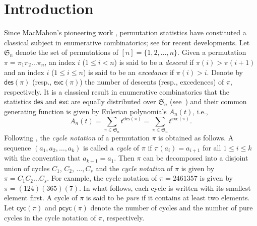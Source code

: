 \documentclass[12pt]{article}
\numberwithin{equation}{section}
\theoremstyle{plain}
\def\des{\mathsf{des}}
\def\cyc{\mathsf{cyc}}
\def\pcyc{\mathsf{pcyc}}
\def\exc{\mathsf{exc}}
\begin{document}
	\section{Introduction}
	Since MacMahon's pioneering work \cite{Mac}, permutation statistics have constituted a classical subject in enumerative combinatorics; see \cite{Huang-lin-yan jcta, Huang-lin-yan2, Huang-yan AAM, Liujcta, Liu1, Liu2} for recent developments.
	Let $\mathfrak{S}_n$ denote the set of permutations of $[n]=\{1,2,\ldots, n\}$.   Given a permutation $\pi=\pi_1\pi_2\ldots \pi_n$, an index $i$ ($1\leq i<n$) is said to be a {\em descent}
	if $\pi(i)>\pi(i+1)$ and an index $i$ ($1\leq i\leq n$) is said to be an {\em excedance} if $\pi(i)>i$.     Denote by $\des(\pi)$ (resp., $\exc(\pi)$) the number of descents (resp., excedences) of $\pi$, respectively.  
	It is a classical result in  enumerative combinatorics that the statistics $\des$ and $\exc$ are equally  distributed over $\mathfrak{S}_n$ (see~\cite[Chapter 1]{ST}) and their common  generating function is given by Eulerian polynomials $A_n(t)$, i.e.,  
	$$
	A_n(t)=\sum_{\pi \in \mathfrak{S}_n} t^{\des(\pi)}=\sum_{\pi \in \mathfrak{S}_n} t^{\exc(\pi)}.
	$$
	Following \cite[Chapter 1]{ST}, the {\em cycle notation}  of a permutation $\pi$ is obtained as follows. A sequence $(a_1, a_2, \ldots, a_k)$ is called
	a {\em cycle } of $\pi$ if $\pi(a_i)=a_{i+1}$ for all $1\leq i\leq k$ with the convention that 
	$a_{k+1}=a_1$.   Then   $\pi$ can be decomposed  into a disjoint union of cycles $C_1$, $C_2$, $\ldots, C_s$  and the {\em cycle notation} of $\pi$  is given by $\pi=C_1C_2\ldots C_s$. For example, the cycle notation  of $\pi=2461357$ is given by $\pi=(124)(365)(7)$.  In what follows,  each cycle is written with its smallest element first. A cycle of $\pi$ is said to be {\em pure } if it contains at least two elements.   Let $\cyc(\pi)$ and $\pcyc(\pi)$ denote  the number of cycles and the number of pure cycles in the cycle notation of $\pi$, respectively.
	
\end{document}
